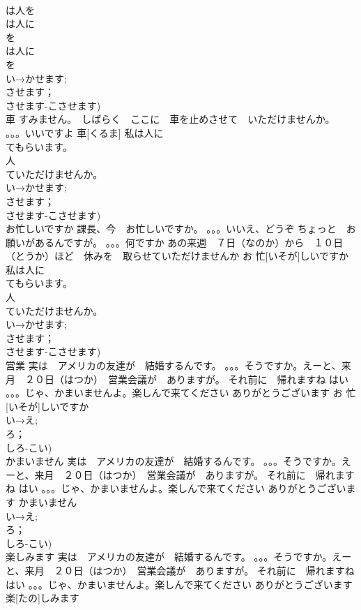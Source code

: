 \documentclass[8pt]{extreport}
\begin{document}
\begin{CJK}{UTF8}{min}
\\	は人を
\\	は人に
\\	を
\\	は人に
\\	を
\\	い→かせます;
\\	させます；
\\	させます-こさせます)
\\	車	すみません。　しばらく　ここに　車を止めさせて　いただけませんか。 。。。いいですよ	車[くるま]				私は人に
\\	てもらいます。
\\	人
\\	ていただけませんか。
\\	い→かせます;
\\	させます；
\\	させます-こさせます)
\\	お忙しいですか	課長、今　お忙しいですか。 。。。いいえ、どうぞ ちょっと　お願いがあるんですが。 。。。何ですか あの来週　７日（なのか）から　１０日（とうか）ほど　休みを　取らせていただけませんか	お 忙[いそが]しいですか			
\\	私は人に
\\	てもらいます。
\\	人
\\	ていただけませんか。
\\	い→かせます;
\\	させます；
\\	させます-こさせます)
\\	営業	実は　アメリカの友達が　結婚するんです。 。。。そうですか。えーと、来月　２０日（はつか）　営業会議が　ありますが。 それ前に　帰れますね はい 。。。じゃ、かまいませんよ。楽しんで来てください ありがとうございます	お 忙[いそが]しいですか			
\\	い→え;
\\	ろ；
\\	しろ-こい)
\\	かまいません	実は　アメリカの友達が　結婚するんです。 。。。そうですか。えーと、来月　２０日（はつか）　営業会議が　ありますが。 それ前に　帰れますね はい 。。。じゃ、かまいませんよ。楽しんで来てください ありがとうございます	かまいません			
\\	い→え;
\\	ろ；
\\	しろ-こい)
\\	楽しみます	実は　アメリカの友達が　結婚するんです。 。。。そうですか。えーと、来月　２０日（はつか）　営業会議が　ありますが。 それ前に　帰れますね はい 。。。じゃ、かまいませんよ。楽しんで来てください ありがとうございます	楽[たの]しみます			

\end{CJK}
\end{document}
